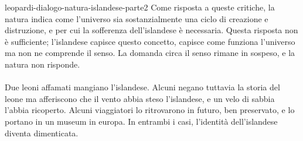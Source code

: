 \documentclass[preview]{standalone}
\begin{document}
\begin{snippet}{leopardi-dialogo-natura-islandese-parte2}
    Come risposta a queste critiche, la natura indica come l'universo sia sostanzialmente
    una ciclo di creazione e distruzione, e per cui la sofferenza dell'islandese
    è necessaria. Questa risposta non è sufficiente; l'islandese capisce questo concetto,
    capisce come funziona l'universo ma non ne comprende il senso.
    La domanda circa il senso rimane in sospeso, e la natura non risponde.
    \\\\
    Due leoni affamati mangiano l'islandese.
    Alcuni negano tuttavia la storia del leone ma afferiscono che il vento abbia steso l'islandese,
    e un velo di sabbia l'abbia ricoperto. Alcuni viaggiatori lo ritrovarono in futuro, ben
    preservato, e lo portano in un museum in europa.
    In entrambi i casi, l'identità dell'islandese diventa dimenticata.
\end{snippet}
\end{document}
